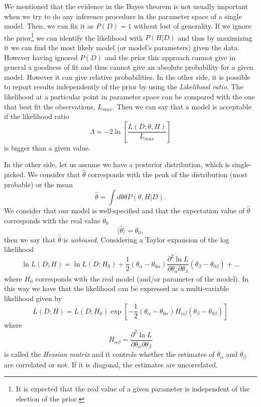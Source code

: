 \documentclass[onecolumn,           %
               showpacs,            %
               preprintnumbers,     %
               aps,                 %
               prl,          	    %
               letterpaper,             %
               superscriptaddress,      %
               nofootinbib,         %
               tightenlines,        %
               floats,floatfix      %
               ,usenatbib,
               ]{revtex4-1}
\begin{document}
We mentioned that the evidence in the Bayes theorem is not usually important when we try to do any inference procedure in the parameter space of a single model. Then, we can fix it as $P(D)=1$ without lost of generality. If we ignore the prior\footnote{It is expected that the real value of a given parameter is independent of the election of the prior.} we can identify the likelihood with $P(H|D)$ and thus by maximizing it we can find the most likely model (or model's parameters) given the data. However having ignored $P(D)$ and the prior this approach cannot give in general a goodness of fit and thus cannot give an absolute probability for a given model. However it can give relative probabilities. In the other side, it is possible to report results independently of the prior by using the \textit{Likelihood ratio}. The likelihood at a particular point in parameter space can be compared with the one that best fit the observations, $L_{max}$. Then we can say that a model is acceptable if the likelihood ratio
\begin{equation}
\Lambda=-2\ln\left[\frac{L(D;\theta,H)}{L_{max}}\right]
\end{equation}
is bigger than a given value.

In the other side, let us assume we have a posterior distribution, which is single-picked. We consider that $\hat \theta$ corresponds with the peak of the distribution (most probable) or the mean
\begin{equation}
\hat \theta =\int d\theta \theta P(\theta,H|D).
\end{equation}
We consider that our model is well-specified and that the expectation value of $\hat \theta$ corresponds with the real value $\theta_0$
\begin{equation}
\langle\hat \theta\rangle=\theta_0,
\end{equation}
then we say that $\hat \theta$ is \textit{unbiased}. Considering a Taylor expansion of the log likelihood
\begin{equation}
\ln L(D;H)=\ln L(D;H_0)+\frac{1}{2}(\theta_\alpha-\theta_{0\alpha})\frac{\partial^2\ln L}{\partial\theta_\alpha \partial\theta_\beta}(\theta_\beta-\theta_{0\beta})+...
\end{equation}
where $H_0$ corresponds with the real model (and/or parameter of the model). In this way we have that the likelihood can be expressed as a multi-variable likelihood given by 
\begin{equation}\label{GLik}
L(D;H)=L(D;H_0)\exp \left[-\frac{1}{2}(\theta_\alpha-\theta_{0\alpha})H_{\alpha\beta}(\theta_\beta-\theta_{0\beta})\right]
\end{equation}
where 
\begin{equation}
H_{\alpha\beta}=\frac{\partial^2\ln L}{\partial\theta_\alpha \partial\theta_\beta}
\end{equation}
is called the \textit{Hessian matrix} and it controls whether the estimates of $\theta_\alpha$ and $\theta_\beta$ are correlated or not. If it is diagonal, the estimates are uncorrelated.
\end{document}
